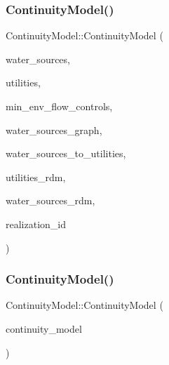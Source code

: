 \subsubsection{\texorpdfstring{Continuity\+Model()}{ContinuityModel()}\hspace{0.1cm}{\footnotesize\ttfamily [1/2]}}
{\footnotesize\ttfamily Continuity\+Model\+::\+Continuity\+Model (\begin{DoxyParamCaption}\item[{vector$<$ \mbox{\hyperlink{classWaterSource}{Water\+Source}} $\ast$$>$ \&}]{water\+\_\+sources,  }\item[{vector$<$ \mbox{\hyperlink{classUtility}{Utility}} $\ast$$>$ \&}]{utilities,  }\item[{vector$<$ \mbox{\hyperlink{classMinEnvFlowControl}{Min\+Env\+Flow\+Control}} $\ast$$>$ \&}]{min\+\_\+env\+\_\+flow\+\_\+controls,  }\item[{const \mbox{\hyperlink{classGraph}{Graph}} \&}]{water\+\_\+sources\+\_\+graph,  }\item[{const vector$<$ vector$<$ int $>$$>$ \&}]{water\+\_\+sources\+\_\+to\+\_\+utilities,  }\item[{vector$<$ double $>$ \&}]{utilities\+\_\+rdm,  }\item[{vector$<$ double $>$ \&}]{water\+\_\+sources\+\_\+rdm,  }\item[{unsigned long}]{realization\+\_\+id }\end{DoxyParamCaption})}

\mbox{\label{classContinuityModel_a7f46eb1f937b813226ca7fee96e5fd5c_a7f46eb1f937b813226ca7fee96e5fd5c}} 
\subsubsection{\texorpdfstring{Continuity\+Model()}{ContinuityModel()}\hspace{0.1cm}{\footnotesize\ttfamily [2/2]}}
{\footnotesize\ttfamily Continuity\+Model\+::\+Continuity\+Model (\begin{DoxyParamCaption}\item[{\mbox{\hyperlink{classContinuityModel}{Continuity\+Model}} \&}]{continuity\+\_\+model }\end{DoxyParamCaption})}

